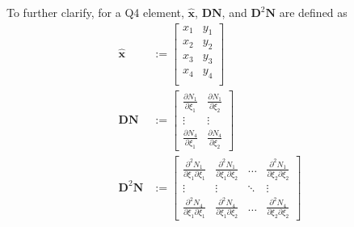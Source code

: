 \documentclass[11pt]{amsart}
\begin{document}
To further clarify, for a Q4 element, $\hat{\boldsymbol{x}}$, $\boldsymbol{DN}$, and $\boldsymbol{D}^2\boldsymbol{N}$ are defined as
\begin{align*}
  \hat{\boldsymbol{x}} &:= \left[ \begin{array}{cc} x_1 & y_1 \\
  x_2 & y_2 \\
  x_3 & y_3 \\
  x_4 & y_4 \\
 \end{array} \right] \\
\boldsymbol{DN} &:= \left[ \begin{array}{cc} \frac{\partial N_1}{\partial \xi_1} & \frac{\partial N_1}{\partial \xi_2} \\
\vdots & \vdots \\
\frac{\partial N_4}{\partial \xi_1} & \frac{\partial N_4}{\partial \xi_2} \end{array} \right] \\
\boldsymbol{D}^2\boldsymbol{N} &:= \left[ \begin{array}{cccc} \frac{\partial^2 N_1}{\partial \xi_1 \partial \xi_1} & \frac{\partial^2 N_1}{\partial \xi_1 \partial \xi_2} & \hdots & \frac{\partial^2 N_1}{\partial \xi_2 \partial \xi_2} \\
\vdots & \vdots  & \ddots & \vdots  \\
\frac{\partial^2 N_4}{\partial \xi_1 \partial \xi_1} & \frac{\partial^2 N_4}{\partial \xi_1 \partial \xi_2} & \hdots & \frac{\partial^2 N_4}{\partial \xi_2 \partial \xi_2} \end{array} \right]
\end{align*}
\end{document}
